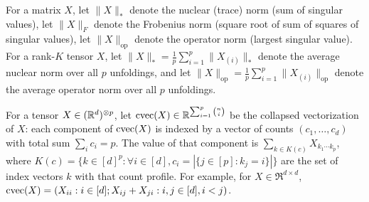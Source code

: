 For a matrix $X$,
let $\|X\|_*$ denote the nuclear (trace) norm (sum of singular values),
let $\|X\|_F$ denote the Frobenius norm (square root of sum of squares of singular values),
let $\|X\|_\text{op}$ denote the operator norm (largest singular value).
For a rank-$K$ tensor $X$,
let $\|X\|_* = \frac{1}{p} \sum_{i=1}^p \|X_{(i)}\|_*$ denote
the average nuclear norm over all $p$ unfoldings,
and let $\|X\|_\text{op} = \frac{1}{p} \sum_{i=1}^p \|X_{(i)}\|_\text{op}$
denote the average operator norm over all $p$ unfoldings.

For a tensor $X \in (\mathbb{R}^d)^{\otimes p}$,
let $\operatorname{cvec}(X) \in \mathbb{R}^{\sum_{i=1}^p \binom{n}{i}}$ be
the collapsed vectorization of $X$: each component of $\operatorname{cvec}(X)$
is indexed by a vector of counts $(c_1, \dots, c_d)$ with total sum $\sum_i c_i = p$.
The value of that component is
$\sum_{k \in K(c)} X_{k_1 \cdots k_p}$,
where $K(c) = \{ k \in [d]^p : \forall i \in [d], c_i = |\{ j \in [p] : k_j = i \}| \}$ are the set of index vectors $k$ with that count profile.
For example, for $X \in \Re^{d \times d}$,
$\operatorname{cvec}(X) = (X_{ii} : i \in [d]; X_{ij} + X_{ji} : i,j \in [d], i<j)$.
